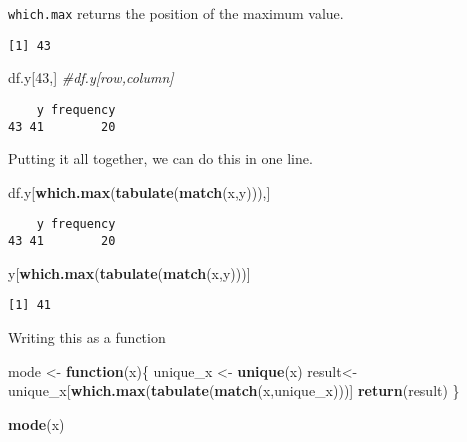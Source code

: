 \documentclass[12pt,]{article}
\newenvironment{Shaded}{\begin{snugshade}}{\end{snugshade}}
\newcommand{\KeywordTok}[1]{\textcolor[rgb]{0.13,0.29,0.53}{\textbf{#1}}}
\newcommand{\DecValTok}[1]{\textcolor[rgb]{0.00,0.00,0.81}{#1}}
\newcommand{\StringTok}[1]{\textcolor[rgb]{0.31,0.60,0.02}{#1}}
\newcommand{\CommentTok}[1]{\textcolor[rgb]{0.56,0.35,0.01}{\textit{#1}}}
\newcommand{\ControlFlowTok}[1]{\textcolor[rgb]{0.13,0.29,0.53}{\textbf{#1}}}
\newcommand{\OperatorTok}[1]{\textcolor[rgb]{0.81,0.36,0.00}{\textbf{#1}}}
\newcommand{\NormalTok}[1]{#1}
\theoremstyle{definition}
\theoremstyle{definition}
\theoremstyle{definition}
\theoremstyle{remark}
\begin{document}
\texttt{which.max} returns the position of the maximum value.

\begin{Shaded}
\end{Shaded}

\begin{verbatim}
[1] 43
\end{verbatim}

\begin{Shaded}
\begin{Highlighting}[]
\NormalTok{df.y[}\DecValTok{43}\NormalTok{,]  }\CommentTok{#df.y[row,column]}
\end{Highlighting}
\end{Shaded}

\begin{verbatim}
    y frequency
43 41        20
\end{verbatim}

Putting it all together, we can do this in one line.

\begin{Shaded}
\begin{Highlighting}[]
\NormalTok{df.y[}\KeywordTok{which.max}\NormalTok{(}\KeywordTok{tabulate}\NormalTok{(}\KeywordTok{match}\NormalTok{(x,y))),] }
\end{Highlighting}
\end{Shaded}

\begin{verbatim}
    y frequency
43 41        20
\end{verbatim}

\begin{Shaded}
\begin{Highlighting}[]
\NormalTok{y[}\KeywordTok{which.max}\NormalTok{(}\KeywordTok{tabulate}\NormalTok{(}\KeywordTok{match}\NormalTok{(x,y)))]}
\end{Highlighting}
\end{Shaded}

\begin{verbatim}
[1] 41
\end{verbatim}

Writing this as a function

\begin{Shaded}
\begin{Highlighting}[]
\NormalTok{mode <-}\StringTok{ }\ControlFlowTok{function}\NormalTok{(x)\{}
\NormalTok{  unique_x <-}\StringTok{ }\KeywordTok{unique}\NormalTok{(x)}
\NormalTok{  result<-unique_x[}\KeywordTok{which.max}\NormalTok{(}\KeywordTok{tabulate}\NormalTok{(}\KeywordTok{match}\NormalTok{(x,unique_x)))]}
  \KeywordTok{return}\NormalTok{(result)}
\NormalTok{\}}

\KeywordTok{mode}\NormalTok{(x)}
\end{Highlighting}
\end{Shaded}
\end{document}
